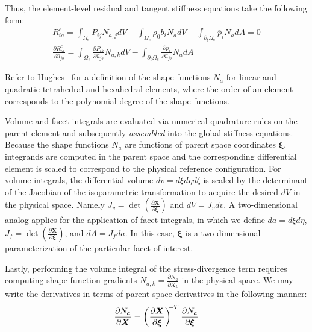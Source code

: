 Thus, the element-level residual and tangent stiffness equations take the following form:
\begin{gather}
R^e_{ia} = \int_{\Omega_e}P_{ij}N_{a,j}dV - \int_{\Omega_e}\rho_0b_iN_adV - \int_{\partial_t\Omega_e} \overline{p}_iN_adA = 0 \label{eqn:elr} \\[0.7em]
\frac{\partial R^e_{ia}}{\partial \hat{u}_{jb}} = \int_{\Omega_e}\frac{\partial P_{ik}}{\partial \hat{u}_{jb}}N_{a,k}dV - \int_{\partial_t\Omega_e}\frac{\partial \overline{p}_i}{\partial \hat{u}_{jb}}N_adA \label{eqn:elt}
\end{gather}

Refer to Hughes~\cite{hughes_2007} for a definition of the shape functions $N_a$ for linear and quadratic tetrahedral and hexahedral elements, where the order of an element corresponds to the polynomial degree of the shape functions.

Volume and facet integrals are evaluated via numerical quadrature rules on the parent element and subsequently \textit{assembled} into the global stiffness equations. Because the shape functions $N_a$ are functions of parent space coordinates $\bm{\xi}$, integrands are computed in the parent space and the corresponding differential element is scaled to correspond to the physical reference configuration. For volume integrals, the differential volume $dv = {d\xi}{d\eta}{d\zeta}$ is scaled by the determinant of the Jacobian of the isoparametric transformation to acquire the desired $dV$ in the physical space. Namely $J_v = \det(\frac{\partial{\bm{X}}}{\partial\bm{\xi}})$ and $dV = J_vdv$. A two-dimensional analog applies for the application of facet integrals, in which we define $da = {d\xi}{d\eta}$, $J_f = \det(\frac{\partial{\bm{X}}}{\partial\bm{\xi}})$, and $dA = J_fda$. In this case, $\bm{\xi}$ is a two-dimensional parameterization of the particular facet of interest.

Lastly, performing the volume integral of the stress-divergence term requires computing shape function gradients $N_{a,k} = \frac{\partial N_a}{\partial X_k}$ in the physical space. We may write the derivatives in terms of parent-space derivatives in the following manner:
\begin{equation}
\frac{\partial N_a}{\partial \bm{X}} = \left(\frac{\partial \bm{X}}{\partial \bm{\xi}}\right)^{\hspace{-0.3em}-T} \hspace{0.05em} \frac{\partial N_a}{\partial \bm{\xi}}
\end{equation}

